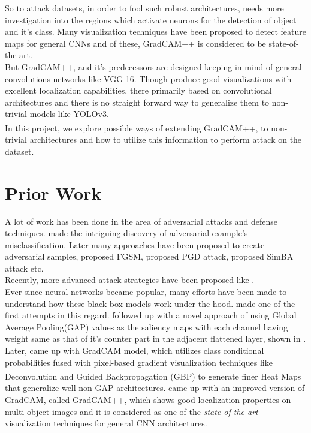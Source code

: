 \documentclass[letterpaper]{article}
\begin{document}
So to attack datasets, in order to fool such robust architectures, needs more investigation into the regions which activate neurons for the detection of object and it's class. Many visualization techniques have been proposed to detect feature maps for general CNNs and of these, GradCAM++ is considered to be state-of-the-art.\\
But GradCAM++, and it's predecessors are designed keeping in mind of general convolutions networks like VGG-16. Though produce good visualizations with excellent localization capabilities, there primarily based on convolutional architectures and there is no straight forward way to generalize them to non-trivial models like YOLOv3.\\
In this project, we explore possible ways of extending GradCAM++\textsuperscript{\cite{Chattopadhay_2018}}, to non-trivial architectures and how to utilize this information to perform attack on the dataset.

\section{Prior Work}
A lot of work has been done in the area of adversarial attacks and defense techniques. \cite{szegedy2014going} made the intriguing discovery of adversarial example's misclassification. Later many approaches have been proposed to create adversarial samples, \cite{goodfellow2015explaining} proposed FGSM, \cite{madry2019deep} proposed PGD attack, \cite{guo2019simple} proposed SimBA attack etc. \\
Recently, more advanced attack strategies have been proposed like \cite{jia2019enhancing} \cite{rahmati2020geoda} \cite{shi2019curls} \cite{xiao2019generating} \cite{duan2020adversarial}.\\
Ever since neural networks became popular, many efforts have been made to understand how these black-box models work under the hood. \cite{zeiler2013visualizing} made one of the first attempts in this regard. \cite{zhou2015learning} followed up with a novel approach of using Global Average Pooling(GAP) values as the saliency maps with each channel having weight same as that of it's counter part in the adjacent flattened layer, shown in . Later, \cite{Selvaraju_2019} came up with GradCAM model, which utilizes class conditional probabilities fused with pixel-based gradient visualization techniques like Deconvolution\textsuperscript{\cite{zeiler2013visualizing}} and Guided Backpropagation (GBP)\textsuperscript{\cite{springenberg2015striving}} to generate finer Heat Maps that generalize well non-GAP architectures. \cite{Chattopadhay_2018} came up with an improved version of GradCAM, called GradCAM++, which shows good localization properties on multi-object images and it is considered as one of the \emph{state-of-the-art} visualization techniques for general CNN architectures.
\end{document}
